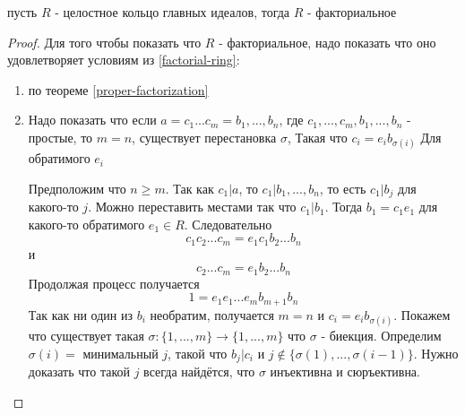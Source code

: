 \documentclass[../main/document.tex]{subfiles}
\begin{document}
\begin{thm}
пусть $R$ - целостное кольцо главных идеалов, тогда $R$ - факториальное
\begin{proof}
Для того чтобы показать что $R$  - факториальное, надо показать что оно удовлетворяет условиям из \ref{factorial-ring}:
\begin{enumerate}
\item по теореме \ref{proper-factorization}
\item Надо показать что если $a=c_1...c_m=b_1,...,b_n$, где $c_1,...,c_m,b_1,...,b_n$ - простые, то $m=n$, существует перестановка $\sigma$, Такая что $c_i=e_ib_{\sigma(i)}$ Для обратимого $e_i$

Предположим что $n\geq m$. Так как $c_1|a$, то $c_1|b_1,...,b_n$, то есть $c_1|b_j$ для какого-то $j$. Можно переставить местами так что $c_1|b_1$. Тогда $b_1=c_1e_1$ для какого-то обратимого $e_1\in R$. Следовательно
$$c_1c_2...c_m=e_1c_1b_2...b_n$$
и
$$c_2...c_m=e_1b_2...b_n$$
Продолжая процесс получается
$$1=e_1e_1...e_mb_{m+1}b_n$$
Так как ни один из $b_i$ необратим, получается $m=n$ и $c_i=e_ib_{\sigma(i)}$. Покажем что существует такая $\sigma:\{1,...,m\}\to\{1,...,m\}$ что $\sigma$ - биекция. Определим $\sigma(i)=$ минимальный $j$, такой что $b_j|c_i$ и $j\not\in\{\sigma(1),...,\sigma(i-1)\}$. Нужно доказать что такой $j$ всегда найдётся, что $\sigma$ инъективна и сюръективна.
 


\end{enumerate}
\end{proof}
\end{thm}
\end{document}
